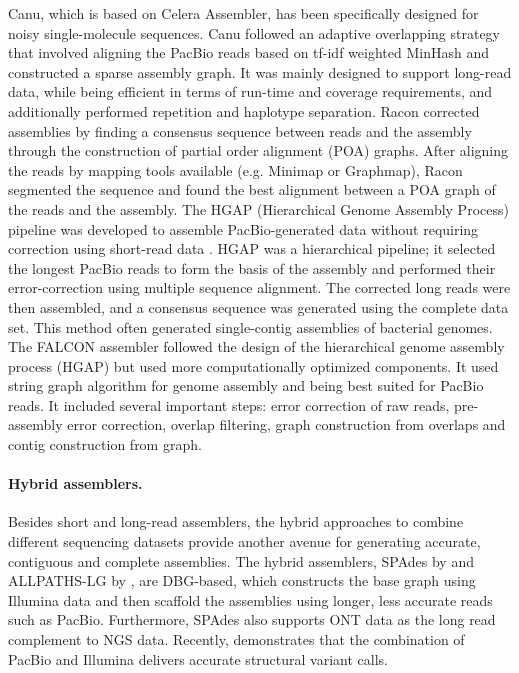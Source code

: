 Canu, which is based on Celera Assembler, has been specifically designed for noisy single-molecule sequences.
Canu followed an adaptive overlapping strategy that involved aligning the PacBio reads based on tf-idf weighted MinHash \citep{berlin2015assembling} and constructed a sparse assembly graph.
It was mainly designed to support long-read data, while being efficient in terms of run-time and coverage requirements, and additionally performed repetition and haplotype separation.
Racon corrected assemblies by finding a consensus sequence between reads and the assembly through the construction of partial order alignment (POA) graphs.
After aligning the reads by mapping tools available (e.g. Minimap or Graphmap),
Racon segmented the sequence and found the best alignment between a POA graph of the reads and the assembly.
The HGAP (Hierarchical Genome Assembly Process) pipeline
was developed to assemble PacBio-generated data without requiring correction using short-read
data \citep{chin2013nonhybrid}. HGAP was a hierarchical pipeline; it selected the longest PacBio reads to form the basis
of the assembly and performed their error-correction using multiple sequence alignment. The corrected
long reads were then assembled, and a consensus sequence was generated using the complete data
set. This method often generated single-contig assemblies of bacterial genomes.
The FALCON assembler followed the design of the hierarchical genome assembly process (HGAP) but used more computationally optimized components. 
It used string graph algorithm for genome assembly and being best suited for PacBio reads.
It included several important steps: error correction of raw reads, pre-assembly error correction, overlap filtering, graph construction from overlaps and contig construction from graph.

\paragraph{Hybrid assemblers.}
Besides short and long-read assemblers, the hybrid approaches to combine different sequencing datasets provide another avenue for generating accurate, contiguous and complete assemblies. 
The hybrid assemblers, SPAdes by \cite{bankevich2012spades} and ALLPATHS-LG by \cite{gnerre2011high}, are DBG-based, which constructs the base graph using Illumina data and then scaffold the assemblies using longer, less accurate reads such as PacBio. 
Furthermore, SPAdes also supports ONT data as the long read complement to NGS data. 
Recently, \cite{fan2017hysa} demonstrates that the combination of PacBio and Illumina delivers accurate structural variant calls.

